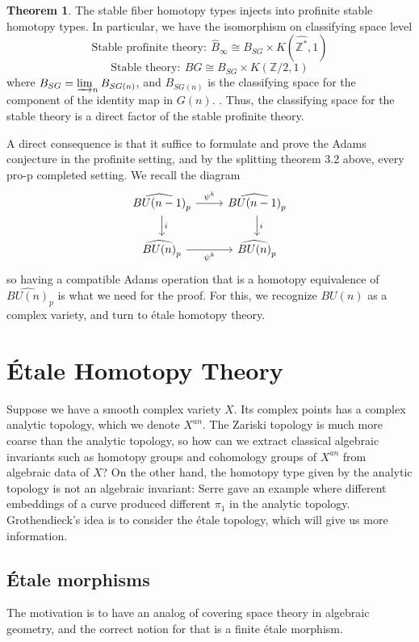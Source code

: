 \documentclass{article}
\theoremstyle{definition}
\newtheorem{theorem}{Theorem}[section]
\theoremstyle{definition}
\theoremstyle{definition}
\theoremstyle{definition}
\theoremstyle{definition}
\theoremstyle{definition}
\theoremstyle{definition}
\begin{document}
\begin{tcolorbox}[colback=red!5!white,colframe=red!30!white]
\begin{theorem}
The stable fiber homotopy types injects into profinite stable homotopy types. In particular, we have the isomorphism on classifying space level 
	\[\textrm{Stable profinite theory}: \ \widehat{B}_{\infty}\cong B_{SG}\times K(\widehat{\mathbb{Z}^*},1)\]
	\[\textrm{Stable theory}: \ BG\cong B_{SG}\times K(\mathbb{Z}/2,1)\]
	where $B_{SG}=\varinjlim_n B_{SG(n)}$, and $B_{SG(n)}$ is the classifying space for the component of the identity map in $G(n)$. . Thus, the classifying space for the stable theory is a direct factor of the stable profinite theory.
\end{theorem}
\end{tcolorbox}
A direct consequence is that it suffice to formulate and prove the Adams conjecture in the profinite setting, and by the splitting theorem 3.2 above, every pro-p completed setting. We recall the diagram 
\[\begin{tikzcd}
	{\widehat{BU(n-1)}_p} & {\widehat{BU(n-1)}_p} \\
	{\widehat{BU(n)}_p} & {\widehat{BU(n)}_p}
	\arrow["{\psi^k}", from=1-1, to=1-2]
	\arrow["i", from=1-1, to=2-1]
	\arrow["i", from=1-2, to=2-2]
	\arrow["{\psi^k}"', from=2-1, to=2-2]
\end{tikzcd}\]
so having a compatible Adams operation that is a homotopy equivalence of $\widehat{BU(n)}_p$ is what we need for the proof. For this, we recognize $BU(n)$ as a complex variety, and turn to \'etale homotopy theory.



\section{\'Etale Homotopy Theory}
Suppose we have a smooth complex variety $X$. Its complex points has a complex analytic topology, which we denote $X^{an}$. The Zariski topology is much more coarse than the analytic topology, so how can we extract classical algebraic invariants such as homotopy groups and cohomology groups of $X^{an}$ from algebraic data of $X$? On the other hand, the homotopy type given by the analytic topology is not an algebraic invariant: Serre gave an example where different embeddings of a curve produced different $\pi_1$ in the analytic topology. Grothendieck's idea is to consider the \'etale topology, which will give us more information.


\subsection{\'Etale morphisms}
The motivation is to have an analog of covering space theory in algebraic geometry, and the correct notion for that is a finite \'etale morphism.
\end{document}
